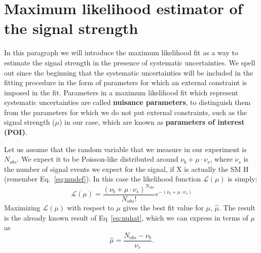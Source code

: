 \documentclass[a4paper,12pt]{article}
\begin{document}
%

\section{Maximum likelihood estimator of the signal strength}
In this paragraph we will introduce the maximum likelihood fit as a way to
estimate the signal strength in the presence of systematic uncertainties.
We spell out since the beginning that the systematic uncertainties will be
included in the fitting procedure in the form of parameters for which an external
constraint is imposed in the fit. Parameters in a maximum likelihood fit which
represent systematic uncertainties are called {\bf nuisance parameters}, to
distinguish them from the parameters for which we do not put external
constraints, such as the signal strength ($\mu$) in our case, which are known as {\bf
parameters of interest (POI)}. 

Let us assume that the random variable that we measure in our experiment is
$N_{obs}$. We expect it to be Poisson-like distributed around
$\nu_b+\mu\cdot\nu_s$, where $\nu_s$ is the number of signal events we expect
for the signal, if X is actually the SM H (remember Eq.~\ref{eq:mudef}).
In this case the likelihood function $\mathcal{L}(\mu)$ is simply:
\begin{equation}
\mathcal{L}(\mu)=\frac{(\nu_b+\mu\cdot\nu_s)^{N_{obs}}}{N_{obs}!}e^{-(\nu_b+\mu\cdot\nu_s)}
\label{eq:likelihood_no_nuisances}
\end{equation}
Maximizing $\mathcal{L}(\mu)$ with respect to $\mu$ gives the best fit value
for $\mu$, $\hat{\mu}$. The result is the already known result of Eq~\ref{eq:nuhat}, 
which we can express in terms of $\mu$ as
\begin{equation}
\hat{\mu} = \frac{N_{obs}-\nu_b}{\nu_s}.
\end{equation}
\end{document}
